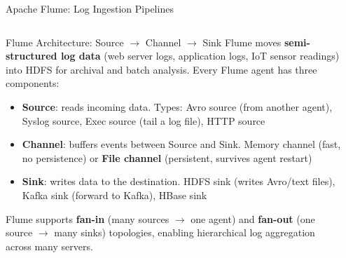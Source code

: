 \documentclass[aspectratio=169,10pt]{beamer}
\begin{document}
\begin{frame}{Apache Flume: Log Ingestion Pipelines}
  \begin{columns}[T]
      \begin{block}{Flume Architecture: Source $\to$ Channel $\to$ Sink}
        Flume moves \textbf{semi-structured log data} (web server logs, application logs, IoT sensor readings) into HDFS for archival and batch analysis.  Every Flume agent has three components:
        \vspace{4pt}
        \begin{itemize}
          \item \textbf{Source}: reads incoming data.  Types: Avro source (from another agent), Syslog source, Exec source (tail a log file), HTTP source
          \item \textbf{Channel}: buffers events between Source and Sink.  Memory channel (fast, no persistence) or \textbf{File channel} (persistent, survives agent restart)
          \item \textbf{Sink}: writes data to the destination.  HDFS sink (writes Avro/text files), Kafka sink (forward to Kafka), HBase sink
        \end{itemize}
        \vspace{4pt}
        Flume supports \textbf{fan-in} (many sources $\to$ one agent) and \textbf{fan-out} (one source $\to$ many sinks) topologies, enabling hierarchical log aggregation across many servers.
      \end{block}

      \begin{center}
\end{center}
\end{columns}
\end{frame}
\end{document}
